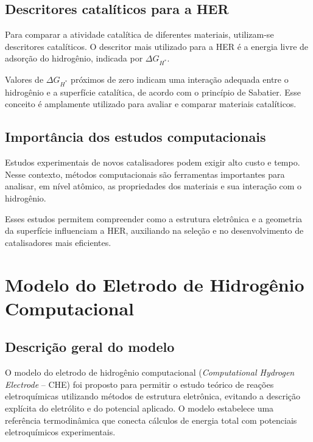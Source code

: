 \subsection{Descritores catalíticos para a HER}

Para comparar a atividade catalítica de diferentes materiais, utilizam-se descritores catalíticos. O descritor mais utilizado para a HER é a energia livre de adsorção do hidrogênio, indicada por \( \Delta G_{H^*} \).

Valores de \( \Delta G_{H^*} \) próximos de zero indicam uma interação adequada entre o hidrogênio e a superfície catalítica, de acordo com o princípio de Sabatier. Esse conceito é amplamente utilizado para avaliar e comparar materiais catalíticos.

\subsection{Importância dos estudos computacionais}

Estudos experimentais de novos catalisadores podem exigir alto custo e tempo. Nesse contexto, métodos computacionais são ferramentas importantes para analisar, em nível atômico, as propriedades dos materiais e sua interação com o hidrogênio.

Esses estudos permitem compreender como a estrutura eletrônica e a geometria da superfície influenciam a HER, auxiliando na seleção e no desenvolvimento de catalisadores mais eficientes.





\section{Modelo do Eletrodo de Hidrogênio Computacional}

\subsection{Descrição geral do modelo}

O modelo do eletrodo de hidrogênio computacional (\textit{Computational Hydrogen Electrode} -- CHE) foi proposto para permitir o estudo teórico de reações eletroquímicas utilizando métodos de estrutura eletrônica, evitando a descrição explícita do eletrólito e do potencial aplicado. O modelo estabelece uma referência termodinâmica que conecta cálculos de energia total com potenciais eletroquímicos experimentais.

